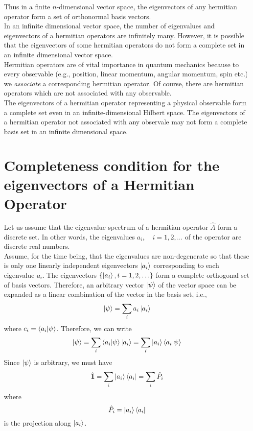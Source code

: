 	Thus in a finite $n$-dimensional vector space, the eigenvectors of any hermitian operator form a set of orthonormal basis vectors.\\
	
	In an infinite dimensional vector space, the number of eigenvalues and eigenvectors of a hermitian operators are infinitely many. However, it is possible that the eigenvectors of some hermitian operators do not form a complete set in an infinite dimensional vector space.\\
	
	
	Hermitian operators are of vital importance in quantum mechanics because to every observable (e.g., position, linear momentum, angular momentum, spin etc.) we \textit{associate} a corresponding hermitian operator. Of course, there are hermitian operators which are not associated with any observable.\\
	
	The eigenvectors of a hermitian operator representing a physical observable form a complete set even in an infinite-dimensional Hilbert space. The eigenvectors of a hermitian operator not associated with any observale may not form a complete basis set in an infinite dimensional space.\\
	
	
	
	\section{Completeness condition for the eigenvectors of a Hermitian Operator}
	Let us assume that the eigenvalue spectrum of a hermitian operator $\hat{A}$ form a discrete set. In other words, the eigenvalues $a_i,\quad i=1,2,\ldots$ of the operator are discrete real numbers.\\
	
	Assume, for the time being, that the eigenvalues are non-degenerate so that these is only one linearly independent eigenvectors $\ket{a_i}$ corresponding to each eigenvalue $a_i$. The eigenvectors $\{\ket{a_i}, i=1,2,\ldots\}$ form a complete orthogonal set of basis vectors. Therefore, an arbitrary vector $\ket{\psi}$ of the vector space can be expanded as a linear combination of the vector in the basis set, i.e.,
	\begin{equation}
		\ket{\psi} = \sum_{i} a_i \ket{a_i}
	\end{equation}
	where $c_i = \braket{a_i}{\psi}$. Therefore, we can write
	\begin{equation}
		\ket{\psi} = \sum_i \braket{a_i}{\psi} \ket{a_i} = \sum_i \ket{a_i}\braket{a_i}{\psi}
	\end{equation}
	Since $\ket{\psi}$ is arbitrary, we must have
	\begin{equation}
		\hat{\mathbf{1}} = \sum_i \ket{a_i}\bra{a_i} = \sum_i \hat{P}_i
		\label{chapter5.eqn1-completeness}
	\end{equation}
	where
	\begin{equation}
		\hat{P}_i = \ket{a_i}\bra{a_i}
		\label{chapter5.eqn2-projection}
	\end{equation}
	is the projection along $\ket{a_i}$.\\
	
